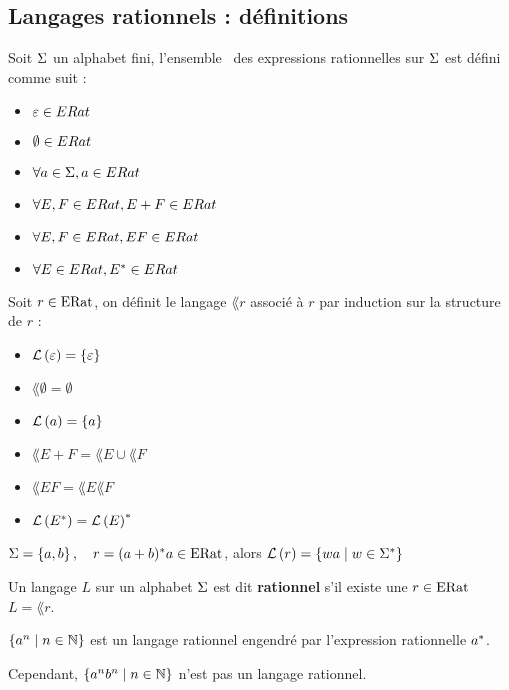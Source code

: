 \subsection{Langages rationnels : définitions}

\begin{definition}
	Soit $\Sigma$ un alphabet fini, l'ensemble \eratsym \ des expressions rationnelles sur $\Sigma$ est défini comme suit :
	\begin{itemize}
		\item $\varepsilon \in ERat$
		\item $\emptyset \in ERat$
		\item $\forall a \in \Sigma, a \in ERat$
		\item $\forall E, F \in ERat, E + F \in ERat$
		\item $\forall E, F \in ERat, EF \in ERat$
		\item $\forall E \in ERat, E^{*} \in ERat$
	\end{itemize}
\end{definition}

\begin{definition}
	Soit $r \in \text{ERat}$, on définit le langage $\lang r$ associé à $r$ par induction sur la structure de $r$ :
	\begin{itemize}
		\item $\mathcal{L}\left(\varepsilon\right) = \left\{\varepsilon\right\}$
		\item $\lang \emptyset = \emptyset$
		\item $\mathcal{L}\left(a\right) = \left\{a\right\}$
		\item $\lang {E + F} = \lang E \cup \lang F$
		\item $\lang {EF} = \lang E \lang F$
		\item $\mathcal{L}\left(E^{*}\right) = \mathcal{L}\left(E\right)^{*}$
	\end{itemize}
\end{definition}

\begin{exemple}
	$ \Sigma = \left\{a, b\right\}, \quad r = (a + b)^{*} a \in \text{ERat} $, alors
	$ \mathcal{L}\left(r\right) = \left\{wa \mid w \in \Sigma^{*}\right\} $
\end{exemple}


\begin{definition}
	Un langage $L$ sur un alphabet $\Sigma$ est dit \textbf{rationnel} s'il existe une \exprat $r \in \text{ERat}$ \tlq $L = \lang r$.

\end{definition}

\begin{exemple}
	$\left\{a^n \mid n \in \mathbb{N}\right\}$ est un langage rationnel engendré par l'expression rationnelle $a^{*}$.

	Cependant, $\left\{a^n b^n \mid n \in \mathbb{N}\right\}$ n'est pas un langage rationnel.
\end{exemple}

